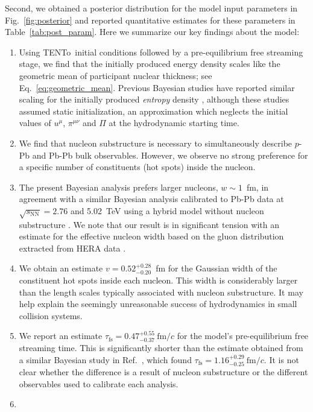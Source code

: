\documentclass[aps,prc,reprint,amsmath,nofootinbib]{revtex4-1}
\newcommand{\trento}{T\raisebox{-0.5ex}{R}ENTo}
\newcommand{\sqrts}{\sqrt{s_\mathrm{NN}}}
\newcommand{\fmc}{\ensuremath{\text{fm}/c}}
\newcommand{\taufs}{\tau_\text{fs}}
\begin{document}
Second, we obtained a posterior distribution for the model input parameters in Fig.~\ref{fig:posterior} and reported quantitative estimates for these parameters in Table~\ref{tab:post_param}.
Here we summarize our key findings about the model:
\begin{enumerate}[itemsep=0pt, leftmargin=2\parindent]
  \item
    Using \trento\ initial conditions followed by a pre-equilibrium free streaming stage, we find that the initially produced energy density scales like the geometric mean of participant nuclear thickness; see Eq.~\eqref{eq:geometric_mean}.
    Previous Bayesian studies have reported similar scaling for the initially produced \emph{entropy} density \cite{Bernhard:2016tnd, Ke:2016jrd}, although these studies assumed static initialization, an approximation which neglects the initial values of $u^\mu$, $\pi^{\mu\nu}$ and $\Pi$ at the hydrodynamic starting time.
  \item
    We find that nucleon substructure is necessary to simultaneously describe $p$-Pb and Pb-Pb bulk observables.
    However, we observe no strong preference for a specific number of constituents (hot spots) inside the nucleon.
  \item
    The present Bayesian analysis prefers larger nucleons, $w \sim 1$~fm, in agreement with a similar Bayesian analysis calibrated to Pb-Pb data at $\sqrts=2.76$ and 5.02~TeV using a hybrid model without nucleon substructure \cite{Bernhard:2018hnz}.
    We note that our result is in significant tension with an estimate for the effective nucleon width based on the gluon distribution extracted from HERA data \cite{Rezaeian:2012ji}.
  \item
    We obtain an estimate $v=0.52_{-0.20}^{+0.28}$~fm for the Gaussian width of the constituent hot spots inside each nucleon.
    This width is considerably larger than the length scales typically associated with nucleon substructure.
    It may help explain the seemingly unreasonable success of hydrodynamics in small collision systems.
  \item
    We report an estimate $\taufs=0.47_{-0.37}^{+0.55}~\fmc$ for the model's pre-equilibrium free streaming time.
    This is significantly shorter than the estimate obtained from a similar Bayesian study in Ref.~\cite{Bernhard:2018hnz}, which found $\taufs=1.16_{-0.25}^{+0.29}\ \fmc$.
    It is not clear whether the difference is a result of nucleon substructure or the different observables used to calibrate each analysis.
  \item

\end{enumerate}
\end{document}

